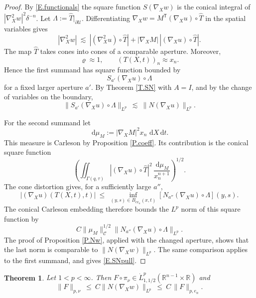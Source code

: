 \documentclass[10pt,a4paper]{amsart}
\numberwithin{equation}{section}
\newcommand{\R}{\mathbb R}
\newcommand{\abs}[1]{\left\vert#1\right\vert}
\newcommand{\pd}{\partial}
\newcommand{\Uc}{\mathcal U}
\newcommand{\Cc}{\mathcal C}
\newcommand{\Gam}{\Gamma}
\renewcommand{\d}{\,\mathrm d}
\newcommand{\Cnorm}[1]{\|#1\|_{\Cc}}
\newtheorem{theorem}[equation]{Theorem}
\begin{document}
\begin{proof}
By \eqref{E.functionals} the square function $S(\nabla_Xw)$ is the conical
integral of $\abs{\nabla_X^2w}^2\delta^{-n}$. Let
$\Lambda:=\widehat T|_{\pd\Uc}$.
Differentiating $\nabla_Xw=M^{\mathsf T}(\nabla_Xu)\circ\widehat T$ in the spatial
variables gives
$$
  \abs{\nabla_X^2w}\ \lesssim\
  \abs{(\nabla_X^2u)\circ\widehat T}
  +\abs{\nabla_XM}\,\abs{(\nabla_Xu)\circ\widehat T} .
$$
The map $\widehat T$ takes cones into cones of a comparable aperture. Moreover,
$$
  \varrho\approx1,\qquad (T(X,t))_n\approx x_n .
$$
Hence the first summand has square function bounded by
$$
  S_{a'}(\nabla_Xu)\circ\Lambda
$$
for a fixed larger aperture $a'$. By Theorem \ref{T.SN} with $A=I$, and by
the change of variables on the boundary,
$$
  \big\|S_{a'}(\nabla_Xu)\circ\Lambda\big\|_{L^p}
  \ \lesssim\ \big\|N(\nabla_Xu)\big\|_{L^p} .
$$

For the second summand let
$$
  \d\mu_M:=\abs{\nabla_XM}^2x_n\,\d X\d t .
$$
This measure is Carleson by Proposition \ref{P.coeff}. Its contribution is
the conical square function
$$
 \left(\iint_{\Gam(q,\tau)}
   \abs{(\nabla_Xu)\circ\widehat T}^2\,
   \frac{\d\mu_M}{x_n^{n+1}}\right)^{1/2}.
$$
The cone distortion gives, for a sufficiently large $a''$,
$$
  \abs{(\nabla_Xu)(T(X,t),t)}\ \le\
  \inf_{(y,s)\in B_{c x_n}(x,t)}
  \left[N_{a''}(\nabla_Xu)\circ\Lambda\right](y,s).
$$
The conical Carleson embedding \cite[Theorem 3]{CMS} therefore bounds the
$L^p$ norm of this square function by
$$
  C\Cnorm{\mu_M}^{1/2}
  \big\|N_{a''}(\nabla_Xu)\circ\Lambda\big\|_{L^p}.
$$
The proof of Proposition \ref{P.Nw}, applied with the changed aperture,
shows that the last norm is comparable to
$\|N(\nabla_Xw)\|_{L^p}$. The same comparison applies to the first
summand, and gives \eqref{E.SNpull}.
\end{proof}

\begin{theorem}\label{T.trace}
Let $1<p<\infty$. Then $F\circ\pi_\nu\in\dot L^p_{1,1/2}(\R^{n-1}\times\R)$ and
\begin{equation}\label{E.trace}
  \|F\|_{p,\nu}\ \le\ C\big\|N(\nabla_Xw)\big\|_{L^p}\ \le\ C\,\|F\|_{p,e_n} .
\end{equation}
\end{theorem}
\end{document}
